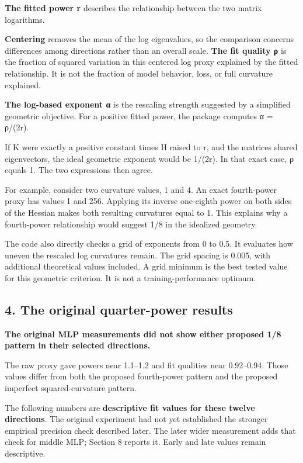 \documentclass[
  14pt,
  letterpaper,
]{extarticle}
\begin{document}
\textbf{The fitted power r} describes the relationship between the two
matrix logarithms.

\textbf{Centering} removes the mean of the log eigenvalues, so the
comparison concerns differences among directions rather than an overall
scale. \textbf{The fit quality ρ} is the fraction of squared variation
in this centered log proxy explained by the fitted relationship. It is
not the fraction of model behavior, loss, or full curvature explained.

\textbf{The log-based exponent α} is the rescaling strength suggested by
a simplified geometric objective. For a positive fitted power, the
package computes α = ρ/(2r).

If K were exactly a positive constant times H raised to r, and the
matrices shared eigenvectors, the ideal geometric exponent would be
1/(2r). In that exact case, ρ equals 1. The two expressions then agree.

For example, consider two curvature values, 1 and 4. An exact
fourth-power proxy has values 1 and 256. Applying its inverse one-eighth
power on both sides of the Hessian makes both resulting curvatures equal
to 1. This explains why a fourth-power relationship would suggest 1/8 in
the idealized geometry.

The code also directly checks a grid of exponents from 0 to 0.5. It
evaluates how uneven the rescaled log curvatures remain. The grid
spacing is 0.005, with additional theoretical values included. A grid
minimum is the best tested value for this geometric criterion. It is not
a training-performance optimum.

\subsection{4. The original quarter-power
results}\label{the-original-quarter-power-results}

\textbf{The original MLP measurements did not show either proposed 1/8
pattern in their selected directions.}

The raw proxy gave powers near 1.1--1.2 and fit qualities near
0.92--0.94. Those values differ from both the proposed fourth-power
pattern and the proposed imperfect squared-curvature pattern.

The following numbers are \textbf{descriptive fit values for these
twelve directions}. The original experiment had not yet established the
stronger empirical precision check described later. The later wider
measurement adds that check for middle MLP; Section 8 reports it. Early
and late values remain descriptive.
\end{document}
